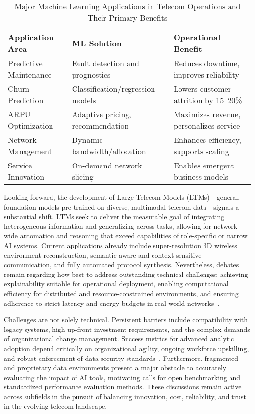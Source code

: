 \documentclass[sigconf]{acmart}
\begin{document}
\begin{table*}[htbp]
\centering
\caption{Major Machine Learning Applications in Telecom Operations and Their Primary Benefits}
\label{tab:ml_benefits_telecom}
\begin{adjustbox}{max width=\textwidth}
\begin{tabular}{lll}
\toprule
\textbf{Application Area} & \textbf{ML Solution} & \textbf{Operational Benefit} \\
\midrule
Predictive Maintenance & Fault detection and prognostics & Reduces downtime, improves reliability \\
Churn Prediction & Classification/regression models & Lowers customer attrition by 15--20\% \\
ARPU Optimization & Adaptive pricing, recommendation & Maximizes revenue, personalizes service \\
Network Management & Dynamic bandwidth/allocation & Enhances efficiency, supports scaling \\
Service Innovation & On-demand network slicing & Enables emergent business models \\
\bottomrule
\end{tabular}
\end{adjustbox}
\end{table*}

Looking forward, the development of Large Telecom Models (LTMs)---general, foundation models pre-trained on diverse, multimodal telecom data---signals a substantial shift. LTMs seek to deliver the measurable goal of integrating heterogeneous information and generalizing across tasks, allowing for network-wide automation and reasoning that exceed capabilities of role-specific or narrow AI systems. Current applications already include super-resolution 3D wireless environment reconstruction, semantic-aware and context-sensitive communication, and fully automated protocol synthesis. Nevertheless, debates remain regarding how best to address outstanding technical challenges: achieving explainability suitable for operational deployment, enabling computational efficiency for distributed and resource-constrained environments, and ensuring adherence to strict latency and energy budgets in real-world networks~\cite{ref8,ref15}.

Challenges are not solely technical. Persistent barriers include compatibility with legacy systems, high up-front investment requirements, and the complex demands of organizational change management. Success metrics for advanced analytic adoption depend critically on organizational agility, ongoing workforce upskilling, and robust enforcement of data security standards~\cite{ref19}. Furthermore, fragmented and proprietary data environments present a major obstacle to accurately evaluating the impact of AI tools, motivating calls for open benchmarking and standardized performance evaluation methods. These discussions remain active across subfields in the pursuit of balancing innovation, cost, reliability, and trust in the evolving telecom landscape.
\end{document}
